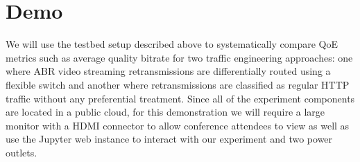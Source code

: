 \section{Demo}
\label{sec:demo}
We will use the testbed setup described above to systematically compare QoE metrics such as average quality bitrate for two traffic engineering approaches: one where ABR video streaming retransmissions are differentially routed using a flexible switch and another where retransmissions are classified as regular HTTP traffic without any preferential treatment. Since all of the experiment components are located in a public cloud, for this demonstration we will require a large monitor with a HDMI connector  to allow conference attendees to view as well as use the Jupyter web instance to interact with our experiment and two power outlets.

